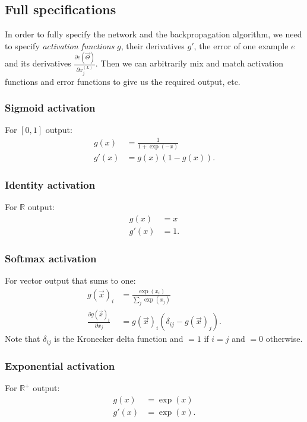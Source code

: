 \subsection{Full specifications}
In order to fully specify the network and the backpropagation algorithm, we need to specify \emph{activation functions} $g$, their derivatives $g'$, the error of one example $e$ and its derivatives $\frac{\partial e(\vec \Theta)}{\partial x_j^{(L)}}$. Then we can arbitrarily mix and match activation functions and error functions to give us the required output, etc.

\subsubsection{Sigmoid activation}
For $[0, 1]$ output:
\begin{align}
    g(x) &= \frac{1}{1 + \exp(-x)} \\
    g'(x) &= g(x)(1 - g(x)).
\end{align}

\subsubsection{Identity activation}
For $\mathbb R$ output:
\begin{align}
    g(x) &= x \\
    g'(x) &= 1.
\end{align}

\subsubsection{Softmax activation}
For vector output that sums to one:
\begin{align}
    g(\vec x)_i                                 &= \frac{\exp(x_i)}{\sum_j \exp(x_j)} \\
    \frac{\partial g(\vec x)_i}{\partial x_j}   &= g(\vec x)_i (\delta_{ij} - g(\vec x)_j).
\end{align}
Note that $\delta_{ij}$ is the Kronecker delta function and $= 1$ if $i = j$ and $= 0$ otherwise.

\subsubsection{Exponential activation}
For $\mathbb R^+$ output:
\begin{align}
    g(x) &= \exp(x) \\
    g'(x) &= \exp(x).
\end{align}

